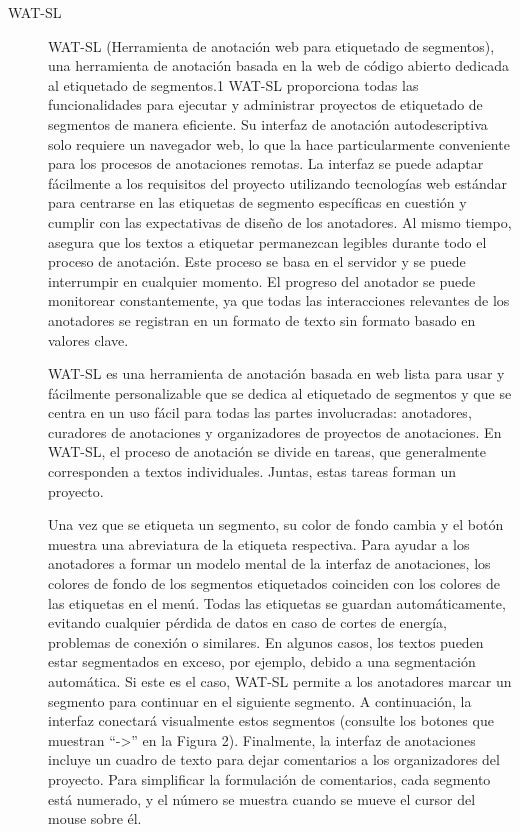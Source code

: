 \begin{description}
\item[WAT-SL]

WAT-SL (Herramienta de anotación web para etiquetado de segmentos), una herramienta de anotación basada en la web de código abierto dedicada al etiquetado de segmentos.1 WAT-SL proporciona todas las funcionalidades para ejecutar y administrar proyectos de etiquetado de segmentos de manera eficiente. Su interfaz de anotación autodescriptiva solo requiere un navegador web, lo que la hace particularmente conveniente para los procesos de anotaciones remotas. La interfaz se puede adaptar fácilmente a los requisitos del proyecto utilizando tecnologías web estándar para centrarse en las etiquetas de segmento específicas en cuestión y cumplir con las expectativas de diseño de los anotadores. Al mismo tiempo, asegura que los textos a etiquetar permanezcan legibles durante todo el proceso de anotación. Este proceso se basa en el servidor y se puede interrumpir en cualquier momento. El progreso del anotador se puede monitorear constantemente, ya que todas las interacciones relevantes de los anotadores se registran en un formato de texto sin formato basado en valores clave.

WAT-SL es una herramienta de anotación basada en web lista para usar y fácilmente personalizable que se dedica al etiquetado de segmentos y que se centra en un uso fácil para todas las partes involucradas: anotadores, curadores de anotaciones y organizadores de proyectos de anotaciones. En WAT-SL, el proceso de anotación se divide en tareas, que generalmente corresponden a textos individuales. Juntas, estas tareas forman un proyecto.

Una vez que se etiqueta un segmento, su color de fondo cambia y el botón muestra una abreviatura de la etiqueta respectiva. Para ayudar a los anotadores a formar un modelo mental de la interfaz de anotaciones, los colores de fondo de los segmentos etiquetados coinciden con los colores de las etiquetas en el menú. Todas las etiquetas se guardan automáticamente, evitando cualquier pérdida de datos en caso de cortes de energía, problemas de conexión o similares.
En algunos casos, los textos pueden estar segmentados en exceso, por ejemplo, debido a una segmentación automática. Si este es el caso, WAT-SL permite a los anotadores marcar un segmento para continuar en el siguiente segmento. A continuación, la interfaz conectará visualmente estos segmentos (consulte los botones que muestran “->” en la Figura 2). Finalmente, la interfaz de anotaciones incluye un cuadro de texto para dejar comentarios a los organizadores del proyecto. Para simplificar la formulación de comentarios, cada segmento está numerado, y el número se muestra cuando se mueve el cursor del mouse sobre él.


\end{description}
